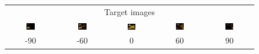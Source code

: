 \begin{figure}[!htb]
\begin{tabular*}{\textwidth}{ c c c c c }
        \multicolumn{5}{c}{Target images} \\
          \includegraphics[width=0.19\textwidth]{figures/results/arb_set/dynamic_light/targ_vc0_ld-90.png}
        & \includegraphics[width=0.19\textwidth]{figures/results/arb_set/dynamic_light/targ_vc0_ld-60.png}
        & \includegraphics[width=0.19\textwidth]{figures/results/arb_set/dynamic_light/targ_vc0_ld0.png}
        & \includegraphics[width=0.19\textwidth]{figures/results/arb_set/dynamic_light/targ_vc0_ld60.png} 
        & \includegraphics[width=0.19\textwidth]{figures/results/arb_set/dynamic_light/targ_vc0_ld90.png} \\
        
        -90 & -60 & 0 & 60 & 90
        

    \end{tabular*}
    \caption{}
    \label{tab:arb_dynamic_light}
\end{figure}
\endgroup